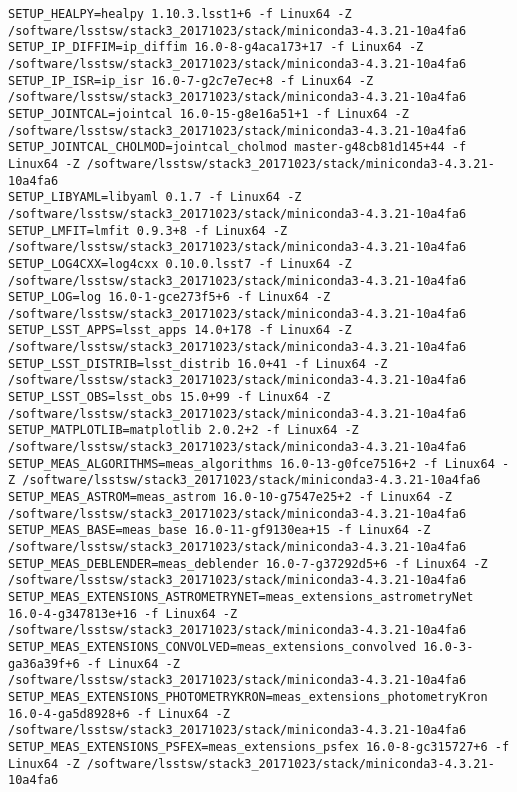 \begin{verbatim}
SETUP_HEALPY=healpy 1.10.3.lsst1+6 -f Linux64 -Z /software/lsstsw/stack3_20171023/stack/miniconda3-4.3.21-10a4fa6
SETUP_IP_DIFFIM=ip_diffim 16.0-8-g4aca173+17 -f Linux64 -Z /software/lsstsw/stack3_20171023/stack/miniconda3-4.3.21-10a4fa6
SETUP_IP_ISR=ip_isr 16.0-7-g2c7e7ec+8 -f Linux64 -Z /software/lsstsw/stack3_20171023/stack/miniconda3-4.3.21-10a4fa6
SETUP_JOINTCAL=jointcal 16.0-15-g8e16a51+1 -f Linux64 -Z /software/lsstsw/stack3_20171023/stack/miniconda3-4.3.21-10a4fa6
SETUP_JOINTCAL_CHOLMOD=jointcal_cholmod master-g48cb81d145+44 -f Linux64 -Z /software/lsstsw/stack3_20171023/stack/miniconda3-4.3.21-10a4fa6
SETUP_LIBYAML=libyaml 0.1.7 -f Linux64 -Z /software/lsstsw/stack3_20171023/stack/miniconda3-4.3.21-10a4fa6
SETUP_LMFIT=lmfit 0.9.3+8 -f Linux64 -Z /software/lsstsw/stack3_20171023/stack/miniconda3-4.3.21-10a4fa6
SETUP_LOG4CXX=log4cxx 0.10.0.lsst7 -f Linux64 -Z /software/lsstsw/stack3_20171023/stack/miniconda3-4.3.21-10a4fa6
SETUP_LOG=log 16.0-1-gce273f5+6 -f Linux64 -Z /software/lsstsw/stack3_20171023/stack/miniconda3-4.3.21-10a4fa6
SETUP_LSST_APPS=lsst_apps 14.0+178 -f Linux64 -Z /software/lsstsw/stack3_20171023/stack/miniconda3-4.3.21-10a4fa6
SETUP_LSST_DISTRIB=lsst_distrib 16.0+41 -f Linux64 -Z /software/lsstsw/stack3_20171023/stack/miniconda3-4.3.21-10a4fa6
SETUP_LSST_OBS=lsst_obs 15.0+99 -f Linux64 -Z /software/lsstsw/stack3_20171023/stack/miniconda3-4.3.21-10a4fa6
SETUP_MATPLOTLIB=matplotlib 2.0.2+2 -f Linux64 -Z /software/lsstsw/stack3_20171023/stack/miniconda3-4.3.21-10a4fa6
SETUP_MEAS_ALGORITHMS=meas_algorithms 16.0-13-g0fce7516+2 -f Linux64 -Z /software/lsstsw/stack3_20171023/stack/miniconda3-4.3.21-10a4fa6
SETUP_MEAS_ASTROM=meas_astrom 16.0-10-g7547e25+2 -f Linux64 -Z /software/lsstsw/stack3_20171023/stack/miniconda3-4.3.21-10a4fa6
SETUP_MEAS_BASE=meas_base 16.0-11-gf9130ea+15 -f Linux64 -Z /software/lsstsw/stack3_20171023/stack/miniconda3-4.3.21-10a4fa6
SETUP_MEAS_DEBLENDER=meas_deblender 16.0-7-g37292d5+6 -f Linux64 -Z /software/lsstsw/stack3_20171023/stack/miniconda3-4.3.21-10a4fa6
SETUP_MEAS_EXTENSIONS_ASTROMETRYNET=meas_extensions_astrometryNet 16.0-4-g347813e+16 -f Linux64 -Z /software/lsstsw/stack3_20171023/stack/miniconda3-4.3.21-10a4fa6
SETUP_MEAS_EXTENSIONS_CONVOLVED=meas_extensions_convolved 16.0-3-ga36a39f+6 -f Linux64 -Z /software/lsstsw/stack3_20171023/stack/miniconda3-4.3.21-10a4fa6
SETUP_MEAS_EXTENSIONS_PHOTOMETRYKRON=meas_extensions_photometryKron 16.0-4-ga5d8928+6 -f Linux64 -Z /software/lsstsw/stack3_20171023/stack/miniconda3-4.3.21-10a4fa6
SETUP_MEAS_EXTENSIONS_PSFEX=meas_extensions_psfex 16.0-8-gc315727+6 -f Linux64 -Z /software/lsstsw/stack3_20171023/stack/miniconda3-4.3.21-10a4fa6

\end{verbatim}
